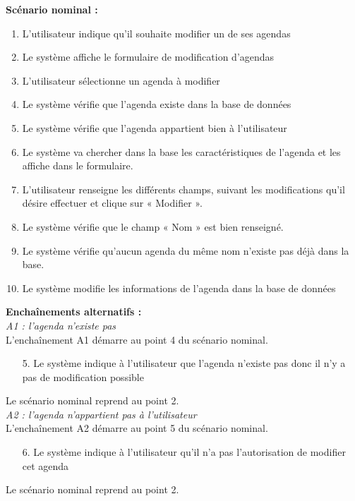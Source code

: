 \documentclass[12pt , a4paper]{article}
\begin{document}
\noindent\textbf{Scénario nominal :}
\begin{enumerate}
\item L’utilisateur indique qu'il souhaite modifier un de ses agendas
\item Le système affiche le formulaire de modification d’agendas
\item L’utilisateur sélectionne un agenda à modifier
\item Le système vérifie que l’agenda existe dans la base de données
\item Le système vérifie que l’agenda appartient bien à l’utilisateur
\item Le système va chercher dans la base les caractéristiques de l’agenda et les affiche dans le formulaire.
\item L’utilisateur renseigne les différents champs, suivant les modifications qu’il désire effectuer et clique sur « Modifier ».
\item Le système vérifie que le champ « Nom » est bien renseigné.
\item Le système vérifie qu’aucun agenda du même nom n’existe pas déjà dans la base.
\item Le système modifie les informations de l’agenda dans la base de données\\
\end{enumerate}

\noindent\textbf{Encha\^inements alternatifs :}\\
\noindent\textit{A1 : l’agenda n’existe pas}\\
L'encha\^inement A1 démarre au point 4 du scénario nominal.
\begin{enumerate}
\item[5.] Le système indique à l’utilisateur que l’agenda n’existe pas donc il n’y a pas de modification possible
\end{enumerate}
Le scénario nominal reprend au point 2.\\


\noindent\textit{A2 : l’agenda n’appartient pas à l’utilisateur}\\
L'encha\^inement A2 démarre au point 5 du scénario nominal.
\begin{enumerate}
\item[6.] Le système indique à l’utilisateur qu’il n’a pas l’autorisation de modifier cet agenda
\end{enumerate}
Le scénario nominal reprend au point 2.\\
\end{document}
